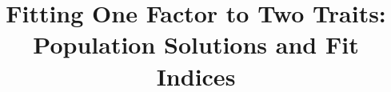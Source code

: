 
\title{Fitting One Factor to Two Traits:\\Population Solutions and Fit Indices}
\ifdefined\preprint
  
\else
  \author{}
  \date{}
\fi

\maketitle








\ifdefined\preprint\fi
\clearpage

\clearpage
\appendix









